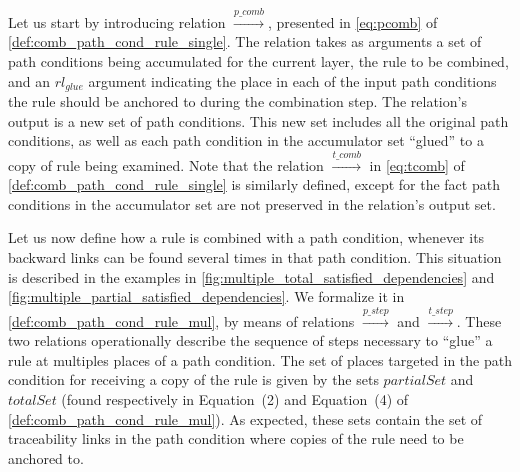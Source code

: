Let us start by introducing relation $\stackrel{p\_comb}{\rightarrow}$, presented in \cref{eq:pcomb} of \cref{def:comb_path_cond_rule_single}. The relation takes as arguments a set of path conditions being accumulated for the current layer, the rule to be combined, and an $rl_{glue}$ argument indicating the place in each of the input path conditions the rule should be anchored to during the combination step. The relation's output is a new set of path conditions. This new set includes all the original path conditions, as well as each path condition in the accumulator set ``glued'' to a copy of rule being examined. Note that the relation $\stackrel{t\_comb}{\rightarrow}$ in \cref{eq:tcomb} of \cref{def:comb_path_cond_rule_single} is similarly defined, except for the fact path conditions in the accumulator set are not preserved in the relation's output set.\\

\setcounter{equation}{0} 

Let us now define how a rule is combined with a path condition, whenever its backward links can be found several times in that path condition. This situation is described in the examples in \cref{fig:multiple_total_satisfied_dependencies} and \cref{fig:multiple_partial_satisfied_dependencies}. We formalize it in \cref{def:comb_path_cond_rule_mul}, by means of relations $\stackrel{p\_step}{\rightarrow}$ and $\stackrel{t\_step}{\rightarrow}$. These two relations operationally describe the sequence of steps necessary to ``glue'' a rule at multiples places of a path condition. The set of places targeted in the path condition for receiving a copy of the rule is given by the sets $partialSet$ and $totalSet$ (found respectively in Equation~(2) and Equation~(4) of \cref{def:comb_path_cond_rule_mul}). As expected, these sets contain the set of traceability links in the path condition where copies of the rule need to be anchored to.

